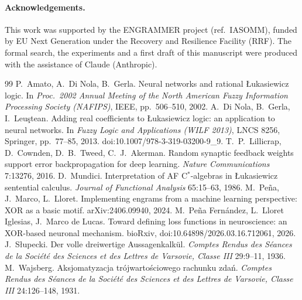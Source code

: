 \documentclass[11pt,a4paper]{article}
\theoremstyle{remark}
\begin{document}
\paragraph{Acknowledgements.} This work was supported by the ENGRAMMER project (ref.~IASOMM), funded by EU Next Generation under the Recovery and Resilience Facility (RRF). The formal search, the experiments and a first draft of this manuscript were produced with the assistance of Claude (Anthropic).

\begin{thebibliography}{99}
 P.~Amato, A.~Di Nola, B.~Gerla. Neural networks and rational \L ukasiewicz logic. In \emph{Proc.\ 2002 Annual Meeting of the North American Fuzzy Information Processing Society (NAFIPS)}, IEEE, pp.~506--510, 2002.
 A.~Di Nola, B.~Gerla, I.~Leu\c{s}tean. Adding real coefficients to \L ukasiewicz logic: an application to neural networks. In \emph{Fuzzy Logic and Applications (WILF 2013)}, LNCS 8256, Springer, pp.~77--85, 2013. doi:10.1007/978-3-319-03200-9\_9.
 T.~P.~Lillicrap, D.~Cownden, D.~B.~Tweed, C.~J.~Akerman. Random synaptic feedback weights support error backpropagation for deep learning. \emph{Nature Communications} 7:13276, 2016.
 D.~Mundici. Interpretation of AF C$^*$-algebras in \L ukasiewicz sentential calculus. \emph{Journal of Functional Analysis} 65:15--63, 1986.
 M.~Pe\~na, J.~Marco, L.~Lloret. Implementing engrams from a machine learning perspective: XOR as a basic motif. arXiv:2406.09940, 2024.
 M.~Pe\~na Fern\'andez, L.~Lloret Iglesias, J.~Marco de Lucas. Toward defining loss functions in neuroscience: an XOR-based neuronal mechanism. bioRxiv, doi:10.64898/2026.03.16.712061, 2026.
 J.~S\l upecki. Der volle dreiwertige Aussagenkalk\"ul. \emph{Comptes Rendus des S\'eances de la Soci\'et\'e des Sciences et des Lettres de Varsovie, Classe III} 29:9--11, 1936.
 M.~Wajsberg. Aksjomatyzacja tr\'ojwarto\'sciowego rachunku zda\'n. \emph{Comptes Rendus des S\'eances de la Soci\'et\'e des Sciences et des Lettres de Varsovie, Classe III} 24:126--148, 1931.
\end{thebibliography}
\end{document}
